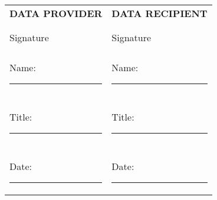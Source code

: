 \documentclass[12pt,letterpaper]{article}
\begin{document}
\vspace{1cm}

\begin{tabular}{l l}
\textbf{DATA PROVIDER} & \textbf{DATA RECIPIENT} \\
\\
\\ \hline
Signature & Signature \\
\\
Name: \rule{5cm}{0.4pt} & Name: \rule{5cm}{0.4pt} \\
\\
Title: \rule{5cm}{0.4pt} & Title: \rule{5cm}{0.4pt} \\
\\
Date: \rule{5cm}{0.4pt} & Date: \rule{5cm}{0.4pt} \\
\end{tabular}
\end{document}
